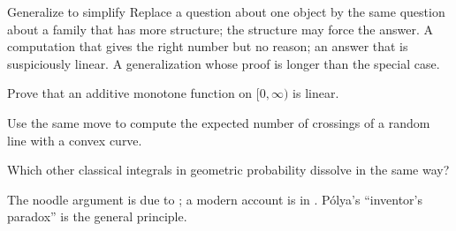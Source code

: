 \documentclass{missingbook}
\begin{document}
\begin{refsection}
\begin{move}{Generalize to simplify}
 Replace a question about one object by the same question about a family that has more structure; the structure may force the answer.
 A computation that gives the right number but no reason; an answer that is suspiciously linear.
 A generalization whose proof is longer than the special case.
\end{move}


\begin{exercises}
\item \consolidation Prove that an additive monotone function on $[0,\infty)$ is linear.\label{ex:sample:additive}
\item \transfer\hard Use the same move to compute the expected number of crossings of a random line with a convex curve. 
\item \research\harder Which other classical integrals in geometric probability dissolve in the same way?
\end{exercises}

\notesandrefs
The noodle argument is due to \textcite{Barbier1860}; a modern account is in \textcite{AignerZiegler2018}. P\'olya's ``inventor's paradox'' \parencite{Polya1945} is the general principle.

\printchapterbib
\end{refsection}

\printindex
\end{document}
